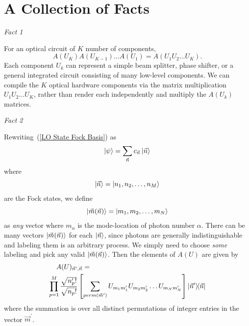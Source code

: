 \documentclass[aps,pra,twocolumn,showpacs,superscriptaddress,floatfix,10pt]{revtex4}
\begin{document}
\section{A Collection of Facts}
\label{Section of Facts}
\begin{center}\textit{Fact 1} \end{center}
For an optical circuit of $K$ number of components,
\begin{equation}
	\label{Fact 1}
A(U_K) A(U_{K-1}) \dots A(U_1) = A(U_1 U_2 \dots U_K).
\end{equation}
Each component $U_k$ can represent a simple beam splitter, phase shifter, or a general integrated circuit consisting of many low-level components. We can compile the $K$ optical hardware components via the matrix multiplication $U_1 U_2 \dots U_K$, rather than render each independently and multiply the $A(U_k)$ matrices.
\begin{center}\textit{Fact 2} \end{center}
Rewriting~(\ref{LO State Fock Basis}) as
\begin{equation}
\label{LO State Fock Vec Basis}
\ket{\psi} = \sum_{\vec{n}} c_{\vec{n}} \ket{\vec{n}}
\end{equation}
where
\begin{equation}
\ket{\vec{n}} = \ket{n_1,n_2,\dots,n_M}
\end{equation}
are the Fock states, we define
\begin{equation}
\label{m definition}
\ket{\vec{m}(\vec{n})} = \ket{m_1,m_2,\dots,m_N}
\end{equation}
as \textit{any} vector where $m_\alpha$ is the mode-location of photon number $\alpha$. There can be many vectors $\ket{\vec{m}(\vec{n})}$ for each $\ket{\vec{n}}$, since photons are generally indistinguishable and labeling them is an arbitrary process. We simply need to choose \textit{some} labeling and pick any valid $\ket{\vec{m}(\vec{n})}$. Then the elements of $A(U)$ are given by
\begin{eqnarray}
\label{Fact 2}
A(U)_{\vec{n}^\prime,\vec{n}} = \quad \quad \quad \quad \quad \quad \quad \quad \quad \quad \quad \quad \quad \quad \quad \quad \quad \\ \small \nonumber \prod_{p=1}^{M} \frac{\sqrt{n_p^\prime !}}{\sqrt{n_p !}} \left[\sum_{perm(\vec{m}^\prime)} U_{m_1 m_1^\prime} U_{m_2 m_2^\prime} \dots U_{m_N m_N^\prime} \right] \outerproduct{\vec{n}^\prime}{\vec{n}} 
\end{eqnarray}
where the summation is over all distinct permutations of integer entries in the vector $\vec{m}^\prime$.
\end{document}
